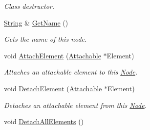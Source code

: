 \begin{DoxyCompactItemize}
\begin{DoxyCompactList}\small\item\em Class destructor. \item\end{DoxyCompactList}\item 
\hyperlink{namespacephys_aa03900411993de7fbfec4789bc1d392e}{String} \& \hyperlink{classphys_1_1Node_a2c834fe00f2f80aa6c0bb62648f9bdb5}{GetName} ()
\begin{DoxyCompactList}\small\item\em Gets the name of this node. \item\end{DoxyCompactList}\item 
void \hyperlink{classphys_1_1Node_a8de0f86b08510a08a6e6c0912c9caddb}{AttachElement} (\hyperlink{classphys_1_1Attachable}{Attachable} $\ast$Element)
\begin{DoxyCompactList}\small\item\em Attaches an attachable element to this \hyperlink{classphys_1_1Node}{Node}. \item\end{DoxyCompactList}\item 
void \hyperlink{classphys_1_1Node_afdafaa00a4c6873211968529993a2b48}{DetachElement} (\hyperlink{classphys_1_1Attachable}{Attachable} $\ast$Element)
\begin{DoxyCompactList}\small\item\em Detaches an attachable element from this \hyperlink{classphys_1_1Node}{Node}. \item\end{DoxyCompactList}\item 
\hypertarget{classphys_1_1Node_a8c0da465ac3b751cd4c124bf3157ce6b}{
void \hyperlink{classphys_1_1Node_a8c0da465ac3b751cd4c124bf3157ce6b}{DetachAllElements} ()}
\label{d0/ddc/classphys_1_1Node_a8c0da465ac3b751cd4c124bf3157ce6b}


\end{DoxyCompactItemize}
